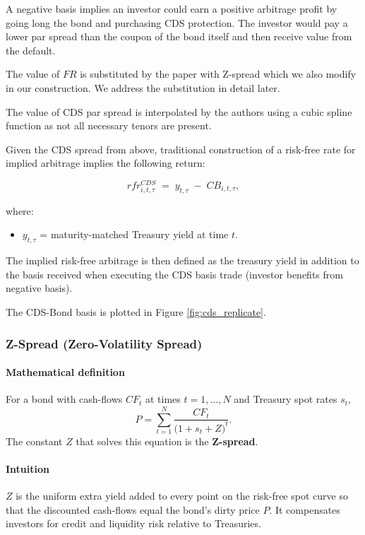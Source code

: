 \documentclass{article}
\begin{document}
\begin{appendices}
A negative basis implies an investor could earn a positive arbitrage profit by going long the bond and purchasing CDS protection. 
The investor would pay a lower par spread than the coupon of the bond itself and then receive value from the default.

The value of $FR$ is substituted by the paper with Z-spread which we also modify in our construction. We address the substitution in detail later.

The value of CDS par spread is interpolated by the authors using a cubic spline function as
not all necessary tenors are present.

Given the CDS spread from above, traditional construction of a risk-free rate for implied arbitrage implies the following return:

\begin{equation}
  rfr^{CDS}_{i,t,\tau} \;=\; y_{t,\tau} \;-\; CB_{i,t,\tau},
\end{equation}

where:
\begin{itemize}
  \item $y_{t,\tau}$ = maturity-matched Treasury yield at time $t$.
\end{itemize}

The implied risk-free arbitrage is then defined as the treasury yield in addition to the basis received when executing the CDS basis trade (investor benefits from negative basis).

The CDS-Bond basis is plotted in Figure \ref{fig:cds_replicate}.    

\subsubsection{Z-Spread (Zero-Volatility Spread)}

\paragraph*{Mathematical definition}
For a bond with cash-flows $CF_t$ at times $t=1,\dots,N$ and Treasury spot rates $s_t$,
\begin{equation*}
P = \sum_{t=1}^{N} \frac{CF_t}{\bigl(1+s_t+Z\bigr)^t}.
\end{equation*}
The constant $Z$ that solves this equation is the \textbf{Z-spread}.

\paragraph*{Intuition}
$Z$ is the uniform extra yield added to every point on the risk-free spot curve so that the discounted cash-flows equal the bond's dirty price $P$. It compensates investors for credit and liquidity risk relative to Treasuries.


\end{appendices}
\end{document}
